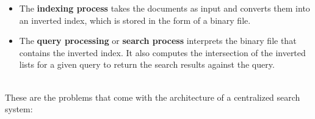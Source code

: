 \begin{itemize}
\item
\protect{}\label{IJyJm67_Jznk1xZB1ya2x}
The \textbf{indexing process} takes the documents as input and converts them into an inverted index, which is stored in the form of a binary file.
\item
\protect{}\label{-ZJLjImKVqk3hzZVU0HYG}
The \textbf{query processing} or \textbf{search process} interprets the binary file that contains the inverted index. It also computes the intersection of the inverted lists for a given query to return the search results against the query.
\end{itemize}
\\
These are the problems that come with the architecture of a centralized search system:

